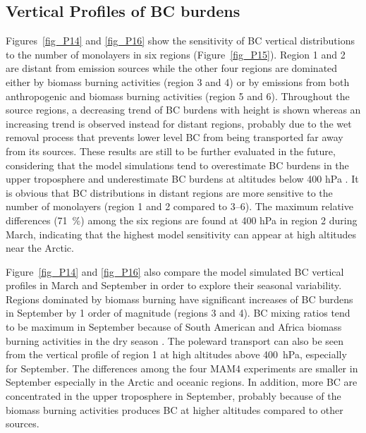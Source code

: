 \documentclass[12pt, fullpage]{uiucthesis2009}
\begin{document}
	\subsection{Vertical Profiles of BC burdens}
	Figures~\ref{fig_P14} and \ref{fig_P16} show the sensitivity of BC vertical distributions to the number of monolayers in six regions (Figure~\ref{fig_P15}). Region 1 and 2 are distant from emission sources while the other four regions are dominated either by biomass burning activities (region 3 and 4) or by emissions from both anthropogenic and biomass burning activities (region 5 and 6). Throughout the source regions, a decreasing trend of BC burdens with height is shown whereas an increasing trend is observed instead for distant regions, probably due to the wet removal process that prevents lower level BC from being transported far away from its sources. These results are still to be further evaluated in the future, considering that the model simulations tend to overestimate BC burdens in the upper troposphere and underestimate BC burdens at altitudes below 400 hPa \citep{Liu2016}. It is obvious that BC distributions in distant regions are more sensitive to the number of monolayers (region 1 and 2 compared to 3--6). The maximum relative differences (71~$\%$) among the six regions are found at 400 hPa in region 2 during March, indicating that the highest model sensitivity can appear at high altitudes near the Arctic. 
	
	Figure~\ref{fig_P14} and \ref{fig_P16} also compare the model simulated BC vertical profiles in March and September in order to explore their seasonal variability. Regions dominated by biomass burning have significant increases of BC burdens in September by 1 order of magnitude (regions 3 and 4). BC mixing ratios tend to be maximum in September because of South American and Africa biomass burning activities in the dry season \citep{Liu2016}. The poleward transport can also be seen from the vertical profile of region 1 at high altitudes above 400~hPa, especially for September. The differences among the four MAM4 experiments are smaller in September especially in the Arctic and oceanic regions. In addition, more BC are concentrated in the upper troposphere in September, probably because of the biomass burning activities produces BC at higher altitudes compared to other sources. 
	
\end{document}
